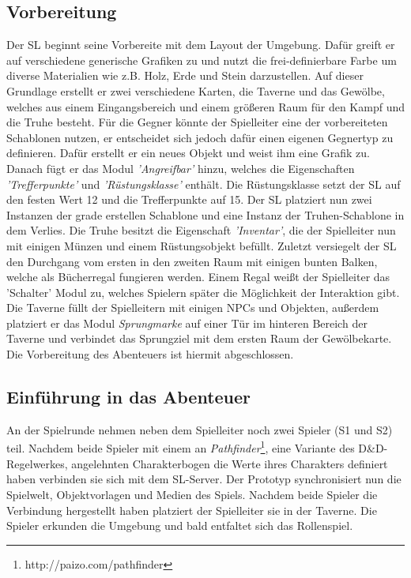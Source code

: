 \subsection{Vorbereitung}
\label{sec:Vorbereitung}
Der SL beginnt seine Vorbereite mit dem Layout der Umgebung. Dafür greift er auf verschiedene generische Grafiken zu und nutzt die frei-definierbare Farbe um diverse Materialien wie z.B. Holz, Erde und Stein darzustellen. Auf dieser Grundlage erstellt er zwei verschiedene Karten, die Taverne und das Gewölbe, welches aus einem Eingangsbereich und einem größeren Raum für den Kampf und die Truhe besteht. Für die Gegner könnte der Spielleiter eine der vorbereiteten Schablonen nutzen, er entscheidet sich jedoch dafür einen eigenen Gegnertyp zu definieren. Dafür erstellt er ein neues Objekt und weist ihm eine Grafik zu. Danach fügt er das Modul \emph{'Angreifbar'} hinzu, welches die Eigenschaften \emph{'Trefferpunkte'} und \emph{'Rüstungsklasse'} enthält. Die Rüstungsklasse setzt der SL auf den festen Wert 12 und die Trefferpunkte auf 15.\newline
Der SL platziert nun zwei Instanzen der grade erstellen Schablone und eine Instanz der Truhen-Schablone in dem Verlies. Die Truhe besitzt die Eigenschaft \emph{'Inventar'}, die der Spielleiter nun mit einigen Münzen und einem Rüstungsobjekt befüllt. Zuletzt versiegelt der SL den Durchgang vom ersten in den zweiten Raum mit einigen bunten Balken, welche als Bücherregal fungieren werden. Einem Regal weißt der Spielleiter das 'Schalter' Modul zu, welches Spielern später die Möglichkeit der Interaktion gibt.\newline
Die Taverne füllt der Spielleitern mit einigen NPCs und Objekten, außerdem platziert er das Modul \emph{Sprungmarke} auf einer Tür im hinteren Bereich der Taverne und verbindet das Sprungziel mit dem ersten Raum der Gewölbekarte. Die Vorbereitung des Abenteuers ist hiermit abgeschlossen.

\subsection{Einführung in das Abenteuer}
\label{sec:EinführungInDasAbenteuer}


An der Spielrunde nehmen neben dem Spielleiter noch zwei Spieler (S1 und S2) teil. Nachdem beide Spieler mit einem an \emph{Pathfinder}\footnote{http://paizo.com/pathfinder}, eine Variante des D\&D-Regelwerkes, angelehnten Charakterbogen die Werte ihres Charakters definiert haben verbinden sie sich mit dem SL-Server. Der Prototyp synchronisiert nun die Spielwelt, Objektvorlagen und Medien des Spiels. Nachdem beide Spieler die Verbindung hergestellt haben platziert der Spielleiter sie in der Taverne.\newline
Die Spieler erkunden die Umgebung und bald entfaltet sich das Rollenspiel. 

